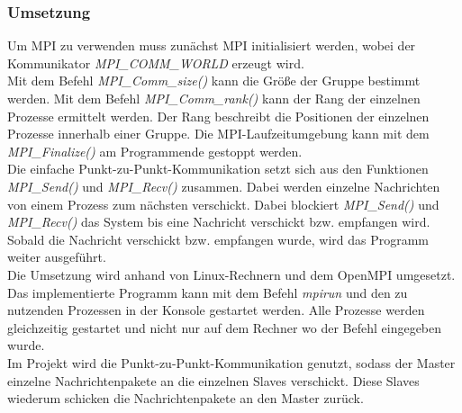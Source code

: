 \subsubsection{Umsetzung} Um MPI zu verwenden muss zunächst MPI initialisiert werden, wobei der  Kommunikator \textit{MPI\_COMM\_WORLD} erzeugt wird. \\
Mit dem Befehl \textit{MPI\_Comm\_size()} kann die Größe der Gruppe bestimmt werden. Mit dem Befehl \textit{MPI\_Comm\_rank()} kann der Rang der einzelnen Prozesse ermittelt werden. Der Rang beschreibt die Positionen der einzelnen Prozesse innerhalb einer Gruppe.
Die MPI-Laufzeitumgebung kann mit dem \textit{MPI\_Finalize()} am Programmende gestoppt werden.\\
Die einfache Punkt-zu-Punkt-Kommunikation setzt sich aus den Funktionen \textit{MPI\_Send()} und \textit{MPI\_Recv()} zusammen. Dabei werden einzelne Nachrichten von einem Prozess zum nächsten verschickt. Dabei blockiert \textit{MPI\_Send()} und \textit{MPI\_Recv()} das System bis eine Nachricht verschickt bzw. empfangen wird. Sobald die Nachricht verschickt bzw. empfangen wurde, wird das Programm weiter ausgeführt. \\
Die Umsetzung wird anhand von Linux-Rechnern und dem OpenMPI umgesetzt. Das implementierte Programm kann mit dem Befehl \textit{mpirun} und den zu nutzenden Prozessen in der Konsole gestartet werden. Alle Prozesse werden gleichzeitig gestartet und nicht nur auf dem Rechner wo der Befehl eingegeben wurde.\\
Im Projekt wird die Punkt-zu-Punkt-Kommunikation genutzt, sodass der Master einzelne Nachrichtenpakete an die einzelnen Slaves verschickt. Diese Slaves wiederum schicken die Nachrichtenpakete an den Master zurück.\cite{b1} \\